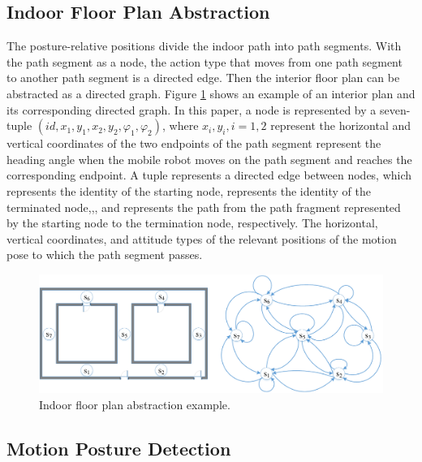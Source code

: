 \documentclass{llncs}
\begin{document}
\subsection{Indoor Floor Plan Abstraction}

The posture-relative positions divide the indoor path into path segments. With the path segment as a node, the action type that moves from one path segment to another path segment is a directed edge. Then the interior floor plan can be abstracted as a directed graph. Figure \ref{fig-abstract} shows an example of an interior plan and its corresponding directed graph. In this paper, a node is represented by a seven-tuple $(id,{x_1},{y_1},{x_2},{y_2},{\varphi _1},{\varphi _2})$, where ${x_i},{y_i},i = 1,2$ represent the horizontal and vertical coordinates of the two endpoints of the path segment represent the heading angle when the mobile robot moves on the path segment and reaches the corresponding endpoint. A tuple represents a directed edge between nodes, which represents the identity of the starting node, represents the identity of the terminated node,,, and represents the path from the path fragment represented by the starting node to the termination node, respectively. The horizontal, vertical coordinates, and attitude types of the relevant positions of the motion pose to which the path segment passes.

\begin{figure}[!htbp]
	\centering
	\includegraphics[width=4.576in]{RobotMatch-MapAbstract}
	\caption{Indoor floor plan abstraction example.}
	\label{fig-abstract}
\end{figure}

\subsection{Motion Posture Detection}
\end{document}
